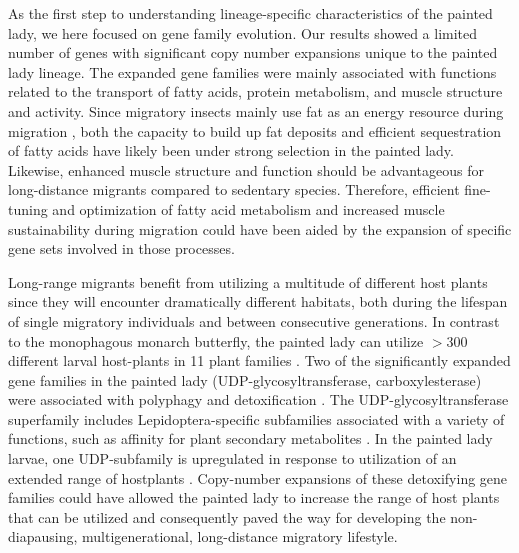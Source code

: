\documentclass[twocolumn]{bmcart}%
\begin{document}
As the first step to understanding lineage-specific characteristics of the painted lady, we here focused on gene family evolution. Our results showed a limited number of genes with significant copy number expansions unique to the painted lady lineage. The expanded gene families were mainly associated with functions related to the transport of fatty acids, protein metabolism, and muscle structure and activity. Since migratory insects mainly use fat as an energy resource during migration \citep{landysMetabolicProfileLongdistance2005, murataUtilizationLipidFlight2013, srygleyOptimalStrategiesInsects2008, weberPhysiologyLongdistanceMigration2009}, both the capacity to build up fat deposits and efficient sequestration of fatty acids have likely been under strong selection in the painted lady. Likewise, enhanced muscle structure and function should be advantageous for long-distance migrants compared to sedentary species. Therefore, efficient fine-tuning and optimization of fatty acid metabolism and increased muscle sustainability during migration could have been aided by the expansion of specific gene sets involved in those processes.

Long-range migrants benefit from utilizing a multitude of different host plants since they will encounter dramatically different habitats, both during the lifespan of single migratory individuals and between consecutive generations. In contrast to the monophagous monarch butterfly, the painted lady can utilize $>300$ different larval host-plants in 11 plant families \citep{celorio-manceraEvolutionaryHistoryHost2016, nylinHOSTPLANTUTILIZATION2014,ackery_hostplants_1988}. Two of the significantly expanded gene families in the painted lady (UDP-glycosyltransferase, carboxylesterase) were associated with polyphagy and detoxification \citep{breeschotenExpandingMenuAre2022, hatfieldCarboxylesterasesGeneralDetoxifying2016, nagareGlycosyltransferasesMultifacetedEnzymatic2021}. The UDP-glycosyltransferase superfamily includes Lepidoptera-specific subfamilies associated with a variety of functions, such as affinity for plant secondary metabolites \citep{huangUDPglucosyltransferaseMultigeneFamily2008, luqueCharacterizationNovelSilkworm2002}. In the painted lady larvae, one UDP-subfamily is upregulated in response to utilization of an extended range of hostplants \citep{celorio-manceraEvolutionaryHistoryHost2016}. Copy-number expansions of these detoxifying gene families could have allowed the painted lady to increase the range of host plants that can be utilized and consequently paved the way for developing the non-diapausing, multigenerational, long-distance migratory lifestyle. 
\end{document}
